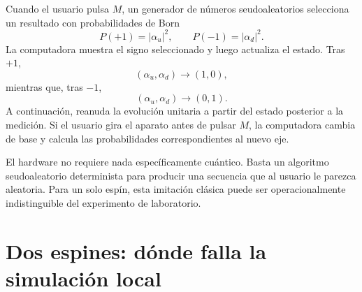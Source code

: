 Cuando el usuario pulsa \(M\), un generador de números seudoaleatorios selecciona un resultado con probabilidades de Born
\begin{equation}
P(+1)=|\alpha_u|^2,
\qquad
P(-1)=|\alpha_d|^2.
\label{eq:l8-one-spin-born}
\end{equation}
La computadora muestra el signo seleccionado y luego actualiza el estado. Tras \(+1\),
\begin{equation}
(\alpha_u,\alpha_d)\longrightarrow(1,0),
\end{equation}
mientras que, tras \(-1\),
\begin{equation}
(\alpha_u,\alpha_d)\longrightarrow(0,1).
\end{equation}
A continuación, reanuda la evolución unitaria a partir del estado posterior a la medición. Si el usuario gira el aparato antes de pulsar \(M\), la computadora cambia de base y calcula las probabilidades correspondientes al nuevo eje.

El hardware no requiere nada específicamente cuántico. Basta un algoritmo seudoaleatorio determinista para producir una secuencia que al usuario le parezca aleatoria. Para un solo espín, esta imitación clásica puede ser operacionalmente indistinguible del experimento de laboratorio.

\begin{classroomqa}
\end{classroomqa}

\begin{classroomqa}
\end{classroomqa}

\section{Dos espines: dónde falla la simulación local}

